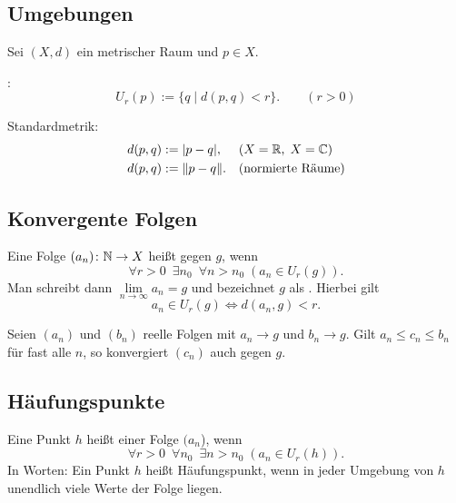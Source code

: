\subsection{Umgebungen}

Sei $(X,d)$ ein metrischer Raum und $p\in X$.

\begin{definition}
:
\begin{equation}
U_r(p) := \{q\mid d(p,q)<r\}.\qquad (r>0)
\end{equation}
\end{definition}
Standardmetrik:
\begin{align}
d(p,q) &:= |p-q|,\quad\; (\text{$X=\mathbb R$,\;\,$X=\mathbb C$})\\
d(p,q) &:=\|p-q\|.\quad (\text{normierte Räume})
\end{align}

\subsection{Konvergente Folgen}
\begin{definition}
Eine Folge $(a_n)\colon \mathbb N\to X$ heißt  gegen $g$,
wenn%
\begin{equation}\label{eq:konvergent}
\forall r{>}0\enspace\exists n_0\enspace\forall n{>}n_0\;
(a_n\in U_r(g)).
\end{equation}
Man schreibt dann $\lim\limits_{n\to\infty} a_n=g$ und bezeichnet
$g$ als .
Hierbei gilt
\begin{equation}
a_n\in U_r(g)\iff d(a_n,g)<r.
\end{equation}
\end{definition}
 Seien $(a_n)$ und $(b_n)$ reelle Folgen
mit $a_n\to g$ und $b_n\to g$. Gilt $a_n\le c_n\le b_n$ für fast alle
$n$, so konvergiert $(c_n)$ auch gegen $g$.

\subsection{Häufungspunkte}
\begin{definition}[Häufungspunkt]
Eine Punkt $h$ heißt  einer Folge $(a_n$), wenn
\begin{equation}
\forall r{>}0\enspace\forall n_0\enspace\exists n{>}n_0\;
(a_n\in U_r(h)).
\end{equation}
In Worten: Ein Punkt $h$ heißt Häufungspunkt, wenn in jeder Umgebung
von $h$ unendlich viele Werte der Folge liegen.
\end{definition}

